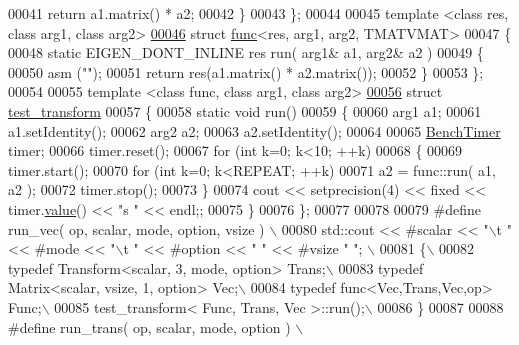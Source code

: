 \begin{DoxyCode}
00041     \textcolor{keywordflow}{return} a1.matrix() * a2;
00042     \}
00043 \};
00044 
00045 \textcolor{keyword}{template} <\textcolor{keyword}{class} res, \textcolor{keyword}{class} arg1, \textcolor{keyword}{class} arg2>
\hyperlink{structfunc_3_01res_00_01arg1_00_01arg2_00_01_t_m_a_t_v_m_a_t_01_4}{00046} \textcolor{keyword}{struct }\hyperlink{structfunc}{func}<res, arg1, arg2, TMATVMAT>
00047 \{
00048     \textcolor{keyword}{static} EIGEN\_DONT\_INLINE res run( arg1& a1, arg2& a2 )
00049     \{
00050     \textcolor{keyword}{asm} (\textcolor{stringliteral}{""});
00051     \textcolor{keywordflow}{return} res(a1.matrix() * a2.matrix());
00052     \}
00053 \};
00054 
00055 \textcolor{keyword}{template} <\textcolor{keyword}{class} func, \textcolor{keyword}{class} arg1, \textcolor{keyword}{class} arg2>
\hyperlink{structtest__transform}{00056} \textcolor{keyword}{struct }\hyperlink{structtest__transform}{test\_transform}
00057 \{
00058     \textcolor{keyword}{static} \textcolor{keywordtype}{void} run()
00059     \{
00060     arg1 a1;
00061     a1.setIdentity();
00062     arg2 a2;
00063     a2.setIdentity();
00064 
00065     \hyperlink{class_eigen_1_1_bench_timer}{BenchTimer} timer;
00066     timer.reset();
00067     \textcolor{keywordflow}{for} (\textcolor{keywordtype}{int} k=0; k<10; ++k)
00068     \{
00069         timer.start();
00070         \textcolor{keywordflow}{for} (\textcolor{keywordtype}{int} k=0; k<REPEAT; ++k)
00071         a2 = func::run( a1, a2 );
00072         timer.stop();
00073     \}
00074     cout << setprecision(4) << fixed << timer.\hyperlink{class_eigen_1_1_bench_timer_a26760f963ed8b64c126159bfea57735e}{value}() << \textcolor{stringliteral}{"s  "} << endl;;
00075     \}
00076 \};
00077 
00078 
00079 \textcolor{preprocessor}{#define run\_vec( op, scalar, mode, option, vsize ) \(\backslash\)}
00080 \textcolor{preprocessor}{    std::cout << #scalar << "\(\backslash\)t " << #mode << "\(\backslash\)t " << #option << " " << #vsize " "; \(\backslash\)}
00081 \textcolor{preprocessor}{    \{\(\backslash\)}
00082 \textcolor{preprocessor}{    typedef Transform<scalar, 3, mode, option> Trans;\(\backslash\)}
00083 \textcolor{preprocessor}{    typedef Matrix<scalar, vsize, 1, option> Vec;\(\backslash\)}
00084 \textcolor{preprocessor}{    typedef func<Vec,Trans,Vec,op> Func;\(\backslash\)}
00085 \textcolor{preprocessor}{    test\_transform< Func, Trans, Vec >::run();\(\backslash\)}
00086 \textcolor{preprocessor}{    \}}
00087 
00088 \textcolor{preprocessor}{#define run\_trans( op, scalar, mode, option ) \(\backslash\)}

\end{DoxyCode}
